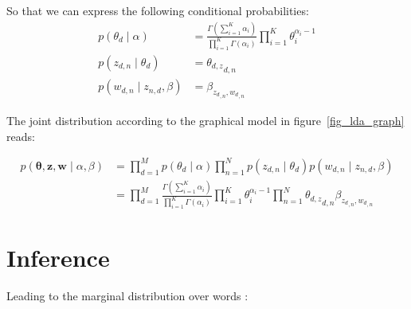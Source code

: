 \documentclass[12pt,a4paper,onecolumn]{article}
\begin{document}
\begin{multicols}{2}
	So that we can express the following conditional probabilities:
	\begin{align*}
		p(\theta_d \mid \alpha)        & = \frac{\Gamma\left(\sum_{i=1}^K \alpha_i\right)}{\prod_{i=1}^K\Gamma(\alpha_i)}\prod_{i=1}^K \theta_i^{\alpha_i -1}
		\\
		p(z_{d,n} \mid \theta_d)       & = {\theta_{d,z}}_{d,n}                                                                                               \\
		p(w_{d,n} \mid z_{n,d}, \beta) & = \beta_{{z_d}_{,n},{w_d}_{,n}}
	\end{align*}



	The joint distribution according to the graphical model in figure~\ref{fig_lda_graph} reads:
\end{multicols}


\begin{align}
	p(\bm{\theta}, \bm{z}, \bm{w} \mid \alpha, \beta) & = \prod_{d=1}^M p(\theta_d \mid \alpha) \prod_{n=1}^N p(z_{d,n} \mid \theta_d)p(w_{d,n} \mid z_{n,d}, \beta)                                                                                       \\
	                                                  & = \prod_{d=1}^M \frac{\Gamma\left(\sum_{i=1}^K \alpha_i\right)}{\prod_{i=1}^K\Gamma(\alpha_i)}\prod_{i=1}^K \theta_i^{\alpha_i -1} \prod_{n=1}^N {\theta_{d,z}}_{d,n}\beta_{{z_d}_{,n},{w_d}_{,n}}
\end{align}
\section{Inference}

Leading to the marginal distribution over words :

%
\end{document}
